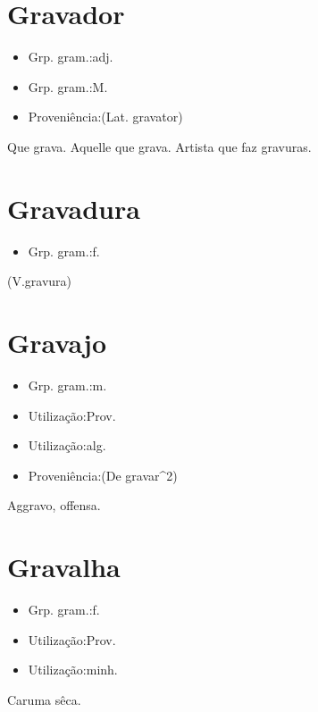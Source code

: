 \section{Gravador}
\begin{itemize}
\item {Grp. gram.:adj.}
\end{itemize}
\begin{itemize}
\item {Grp. gram.:M.}
\end{itemize}
\begin{itemize}
\item {Proveniência:(Lat. \textunderscore gravator\textunderscore )}
\end{itemize}
Que grava.
Aquelle que grava.
Artista que faz gravuras.
\section{Gravadura}
\begin{itemize}
\item {Grp. gram.:f.}
\end{itemize}
(V.gravura)
\section{Gravajo}
\begin{itemize}
\item {Grp. gram.:m.}
\end{itemize}
\begin{itemize}
\item {Utilização:Prov.}
\end{itemize}
\begin{itemize}
\item {Utilização:alg.}
\end{itemize}
\begin{itemize}
\item {Proveniência:(De \textunderscore gravar\textunderscore ^2)}
\end{itemize}
Aggravo, offensa.
\section{Gravalha}
\begin{itemize}
\item {Grp. gram.:f.}
\end{itemize}
\begin{itemize}
\item {Utilização:Prov.}
\end{itemize}
\begin{itemize}
\item {Utilização:minh.}
\end{itemize}
Caruma sêca.
